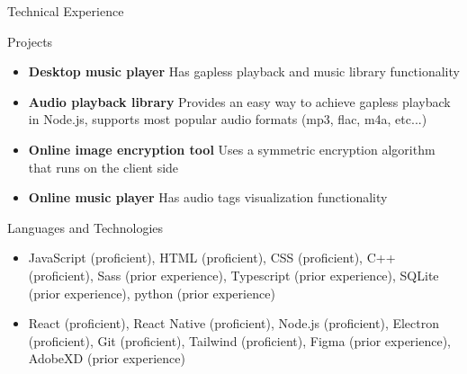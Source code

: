 \documentclass[]{mcdowell-cv/mcdowellcv}
\newcommand\en[1]{#1}
\newcommand\es[1]{}
\newcommand{\proficient}{(\en{proficient}\es{proficiente})}
\newcommand{\experience}{(\en{prior experience}\es{experiencia previa})}
\begin{document}
    \begin{cvsection}{\en{Technical Experience}\es{Experiencia Técnica}}
        \begin{cvsubsection}{\en{Projects}\es{Proyectos}}{}{}
            \begin{itemize}
                \item \textbf{\en{Desktop music player}\es{Reproductor de música para escritorio}}
                \en{Has gapless playback and music library functionality}
                \es{Reproduce música sin pausas entre canción y canción, posee funcionalidad de librería}
            \end{itemize}

            \begin{itemize}
                \item \textbf{\en{Audio playback library}\es{Librería para reproducir audio}}
                \en{Provides an easy way to achieve gapless playback in Node.js, supports most popular audio formats (mp3, flac, m4a, etc...)}
                \es{Provee una forma fácil de reproducir audio sin pausas en Node.js, soporta los formatos más populares (mp3, flac, m4a, etc...)}
            \end{itemize}

            \begin{itemize}
                \item \textbf{\en{Online image encryption tool}\es{Herramienta para encriptar imágenes online}}
                \en{Uses a symmetric encryption algorithm that runs on the client side}
                \es{Usa un algoritmo de cifrado simétrico que es ejecutado en lado del cliente}
            \end{itemize}

            \begin{itemize}
                \item \textbf{\en{Online music player}\es{Reproductor de música online}}
                \en{Has audio tags visualization functionality}
                \es{Posee funcionalidad para visualización de tags de audio}
            \end{itemize}
        \end{cvsubsection}
    \end{cvsection}

    \begin{cvsection}{\en{Languages and Technologies}\es{Lengüajes y Tecnologías}}
        \begin{cvsubsection}{}{}{}
            \begin{itemize}
                \item JavaScript \proficient, HTML \proficient, CSS \proficient, C++ \proficient, Sass \experience, Typescript \experience, SQLite \experience, python \experience
                \item React \proficient, React Native \proficient, Node.js \proficient, Electron \proficient, Git \proficient, Tailwind \proficient, Figma \experience, AdobeXD \experience
            \end{itemize}
        \end{cvsubsection}
    \end{cvsection}
\end{document}
